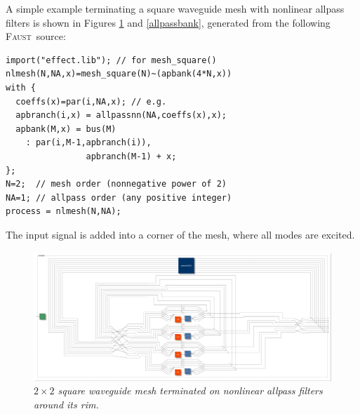 \documentclass[twoside,a4paper]{article}
\newcommand{\Faust}{\textsc{Faust}}
\newcommand{\Faustsp}{\Faust\ }
\begin{document}
A simple example terminating a square waveguide mesh with nonlinear
allpass filters is shown in Figures \ref{meshc} and \ref{allpassbank},
generated from the following \Faustsp source:
\begin{verbatim}
import("effect.lib"); // for mesh_square()
nlmesh(N,NA,x)=mesh_square(N)~(apbank(4*N,x)) 
with {
  coeffs(x)=par(i,NA,x); // e.g.
  apbranch(i,x) = allpassnn(NA,coeffs(x),x);
  apbank(M,x) = bus(M)
    : par(i,M-1,apbranch(i)), 
                apbranch(M-1) + x; 
};
N=2;  // mesh order (nonnegative power of 2)
NA=1; // allpass order (any positive integer)
process = nlmesh(N,NA);
\end{verbatim}
The input signal is added into a corner of the mesh, where all modes
are excited.

\begin{figure}[ht]
\center
\includegraphics[width=6.5in]{fig/meshc.pdf}
\caption{\label{meshc}{\it $2\times2$ square waveguide mesh terminated
    on nonlinear allpass filters around its rim.}}
\end{figure} 
\end{document}

